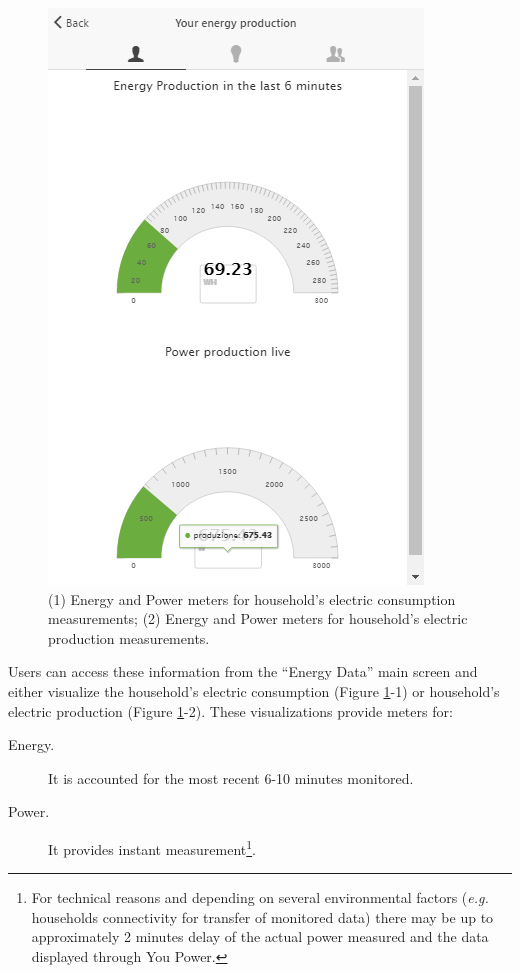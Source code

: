\begin{figure}[htb]
\begin{center}
\begin{minipage}[htb]{0.45\linewidth}
         \includegraphics[width=1\linewidth]{img/visual_production.png}  
        \end{minipage}
      \end{center}
    \caption{(1) Energy and Power meters for household's electric consumption measurements; (2) Energy and Power meters for household's electric production measurements.
}
\label{fig:viz_rt}
\end{figure}

Users can access these information from the ``Energy Data'' main screen and either visualize the household's electric consumption (Figure \ref{fig:viz_rt}-1) or
household's electric production (Figure \ref{fig:viz_rt}-2).
These visualizations provide meters for:
\begin{description}
 \item[Energy.] It is accounted for the most recent 6-10 minutes monitored.
 \item[Power.] It provides instant measurement\footnote{For technical reasons and depending on several environmental factors (\textit{e.g.} households connectivity for transfer of monitored data) there may be up to approximately 2 minutes delay of the actual power measured and the data displayed through You Power.}.
\end{description}



